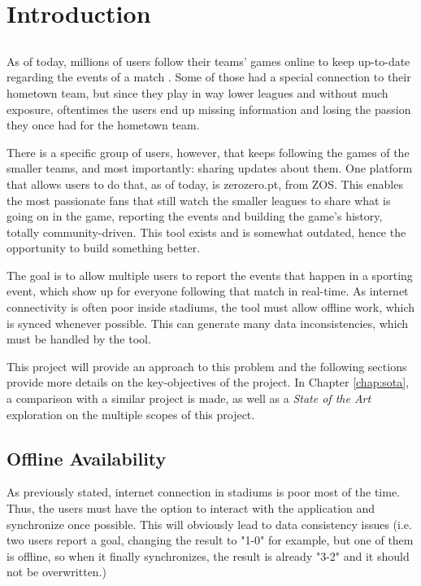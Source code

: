 \chapter{Introduction} \label{chap:intro}

\section*{}

As of today, millions of users follow their teams' games online to keep up-to-date regarding the events of a match \cite{kn:facebook-livestream-stats}. Some of those had a special connection to their hometown team, but since they play in way lower leagues and without much exposure, oftentimes the users end up missing information and losing the passion they once had for the hometown team.

There is a specific group of users, however, that keeps following the games of the smaller teams, and most importantly: sharing updates about them. One platform that allows users to do that, as of today, is zerozero.pt, from ZOS. This enables the most passionate fans that still watch the smaller leagues to share what is going on in the game, reporting the events and building the game's history, totally community-driven. This tool exists and is somewhat outdated, hence the opportunity to build something better.

The goal is to allow multiple users to report the events that happen in a sporting event, which show up for everyone following that match in real-time. As internet connectivity is often poor inside stadiums, the tool must allow offline work, which is synced whenever possible. This can generate many data inconsistencies, which must be handled by the tool.

This project will provide an approach to this problem and the following sections provide more details on the key-objectives of the project. In Chapter \ref{chap:sota}, a comparison with a similar project is made, as well as a \textit{State of the Art} exploration on the multiple scopes of this project.

\section{Offline Availability} \label{sec:offline-avail-intro}

As previously stated, internet connection in stadiums is poor most of the time. Thus, the users must have the option to interact with the application and synchronize once possible. This will obviously lead to data consistency issues (i.e. two users report a goal, changing the result to "1-0" for example, but one of them is offline, so when it finally synchronizes, the result is already "3-2" and it should not be overwritten.)


